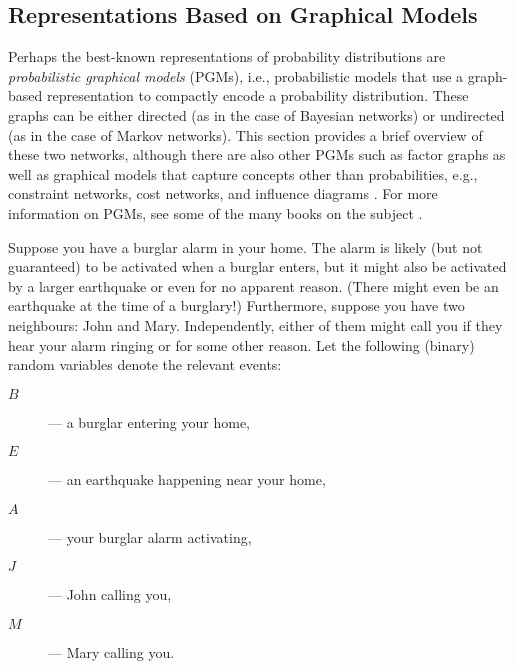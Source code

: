 \subsection{Representations Based on Graphical Models}\label{sec:pgms}

Perhaps the best-known representations of probability distributions are
\emph{probabilistic graphical models} (PGMs), i.e., probabilistic models that
use a graph-based representation to compactly encode a probability distribution.
These graphs can be either directed (as in the case of Bayesian networks) or
undirected (as in the case of Markov networks). This section provides a brief
overview of these two networks, although there are also other PGMs such as
factor graphs
\citep{DBLP:journals/spm/Loeliger04,DBLP:series/synthesis/2016Raedt} as well as
graphical models that capture concepts other than probabilities, e.g.,
constraint networks, cost networks, and influence diagrams
\citep{DBLP:series/synthesis/2019Dechter}. For more information on PGMs, see
some of the many books on the subject
\citep{DBLP:series/synthesis/2019Dechter,DBLP:books/daglib/0023091,DBLP:books/daglib/0066829}.

\begin{example}\label{example:bn}
  Suppose you have a burglar alarm in your home. The alarm is likely (but not
  guaranteed) to be activated when a burglar enters, but it might also be
  activated by a larger earthquake or even for no apparent reason. (There might
  even be an earthquake at the time of a burglary!) Furthermore, suppose you
  have two neighbours: John and Mary. Independently, either of them might call
  you if they hear your alarm ringing or for some other reason. Let the
  following (binary) random variables denote the relevant events:
  \begin{description}
  \item[$B$]--- a burglar entering your home,
  \item[$E$]--- an earthquake happening near your home,
  \item[$A$]--- your burglar alarm activating,
  \item[$J$]--- John calling you,
  \item[$M$]--- Mary calling you.
  \end{description}
\end{example}

